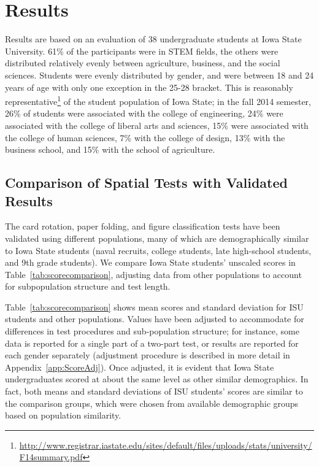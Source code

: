 \documentclass[journal]{vgtc}\usepackage[]{graphicx}\usepackage[]{color}
\begin{document}
\section{Results}\label{sec:results}
Results are based on an evaluation of 38 undergraduate students at Iowa State University. 61\% of the participants were in STEM fields, the others were distributed relatively evenly between agriculture, business, and the social sciences. Students were evenly distributed by gender, and were between 18 and 24 years of age with only one exception in the 25-28 bracket. This is reasonably representative\footnote{\url{http://www.registrar.iastate.edu/sites/default/files/uploads/stats/university/F14summary.pdf}} of the student population of Iowa State; in the fall 2014 semester, 26\% of students were associated with the college of engineering, 24\% were associated with the college of liberal arts and sciences, 15\% were associated with the college of human sciences, 7\% with the college of design, 13\% with the business school, and 15\% with the school of agriculture.  

\subsection{Comparison of Spatial Tests with Validated Results}
The card rotation, paper folding, and figure classification tests have been validated using different populations, many of which are demographically similar to Iowa State students (naval recruits, college students, late high-school students, and 9th grade students). We compare Iowa State students' unscaled scores in Table~\ref{tab:scorecomparison}, adjusting data from other populations to account for subpopulation structure and test length. 

Table~\ref{tab:scorecomparison} shows mean scores and standard deviation for ISU students and other populations. Values have been adjusted to accommodate for differences in test procedures and sub-population structure; for instance,  some data is reported for a single part of a two-part test, or results are reported for each gender separately (adjustment procedure is described in more detail in Appendix~\ref{app:ScoreAdj}). Once adjusted, it is evident that Iowa State undergraduates scored at about the same level as other similar demographics. In fact, both means and standard deviations of ISU students' scores are similar to the comparison groups, which were chosen from available demographic groups based on population similarity. 
\end{document}
